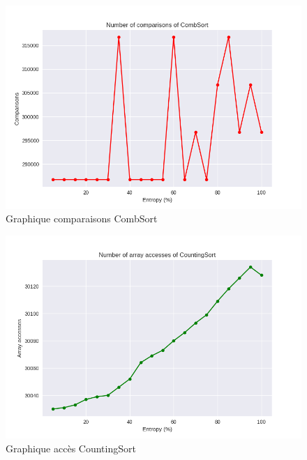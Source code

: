 \documentclass[10pt,a4paper]{article}
\begin{document}
            \begin{figure}
                \centering
                \includegraphics[width=1\textwidth]{graphique/CombSort/GraphComparisonsCombSort.png}
                \caption{Graphique comparaisons CombSort}
                \label{fig:mesh1}
            \end{figure}
            \begin{figure}
                \centering
                \includegraphics[width=1\textwidth]{graphique/CountingSort/GraphAccessesCountingSort.png}
                \caption{Graphique accès CountingSort}
                \label{fig:mesh1}
            \end{figure}
\end{document}
